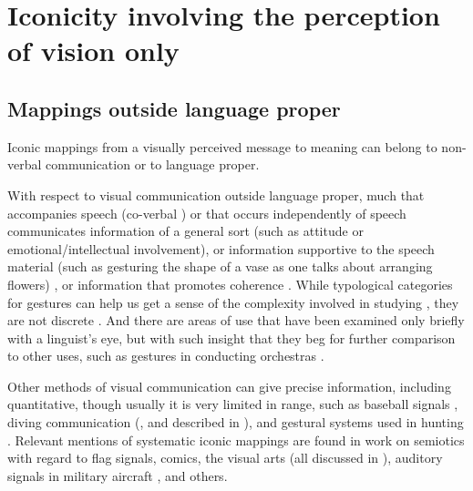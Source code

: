 \documentclass[output=paper,
modfonts
]{LSP/langsci}
\begin{document}
\section{Iconicity involving the perception of vision only}\label{sec:napoli:3}

\subsection{Mappings outside language proper}

Iconic mappings from a visually perceived message to meaning can belong
to non-verbal communication \citep{argyle1975,knapp2013}
or to language proper.

With respect to visual communication outside language proper, much
 that accompanies speech (co-verbal ) or that occurs
independently of speech communicates information of a general sort (such
as attitude or emotional/intellectual involvement), or information
supportive to the speech material (such as gesturing the shape of a vase
as one talks about arranging flowers) \citep{mcneill1992,mcneill2000,goldin-1999,kendon2004,ozyurek2014}, or information that promotes 
coherence \citep{lascarides2009}. While typological categories for
gestures can help us get a sense of the complexity involved in studying
, they are not discrete \citep{streeck2009}. And there are areas of
 use that have been examined only briefly with a linguist's eye,
but with such insight that they beg for further comparison to other
uses, such as gestures in conducting orchestras \citep{boyes-2000}.

Other methods of visual communication can give precise information,
including quantitative, though usually it is very limited in range, such
as baseball signals \citep{komissaroff2016}, diving communication (\citealt{RSTC2005},
and described in \citealt{miskovic2016}), and gestural systems used in
hunting \citep{hindley2014}. Relevant mentions of systematic iconic mappings
are found in work on semiotics with regard to flag signals, comics, the
visual arts (all discussed in \citealt{berger1984}), auditory signals in military
aircraft \citep{doll1986}, and others.
\end{document}
